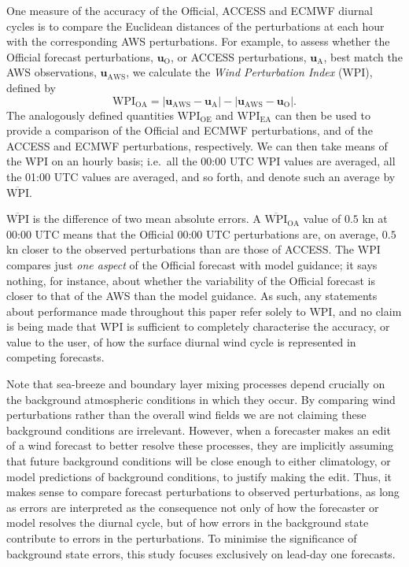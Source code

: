 \documentclass{ametsoc}
\begin{document}
One measure of the accuracy of the Official, ACCESS and ECMWF diurnal cycles is to compare the Euclidean distances of the perturbations at each hour with the corresponding AWS perturbations. For example, to assess whether the Official forecast perturbations, $\boldsymbol{u}_{\text{O}}$, or ACCESS perturbations, $\boldsymbol{u}_{\text{A}}$, best match the AWS observations, $\boldsymbol{u}_{\text{AWS}}$, we calculate the \textit{Wind Perturbation Index} (WPI), defined by 
\begin{equation}
\text{WPI}_\text{OA} = \left\lvert \boldsymbol{u}_{\text{AWS}}-\boldsymbol{u}_{\text{A}} \right\rvert - \left\lvert \boldsymbol{u}_{\text{AWS}}-\boldsymbol{u}_{\text{O}} \right\rvert. \label{Eq:WPI}
\end{equation} 
The analogously defined quantities $\text{WPI}_\text{OE}$ and $\text{WPI}_\text{EA}$ can then be used to provide a comparison of the Official and ECMWF perturbations, and of the ACCESS and ECMWF perturbations, respectively. We can then take means of the WPI on an hourly basis; i.e.~all the 00:00 UTC WPI values are averaged, all the 01:00 UTC values are averaged, and so forth, and denote such an average by $\overline{\text{WPI}}$. 

$\overline{\text{WPI}}$ is the difference of two mean absolute errors. A $\overline{\text{WPI}}_\text{OA}$ value of $0.5$ kn at 00:00 UTC means that the Official 00:00 UTC perturbations are, on average, $0.5$ kn closer to the observed perturbations than are those of ACCESS. The $\text{WPI}$ compares just \textit{one aspect} of the Official forecast with model guidance; it says nothing, for instance, about whether the variability of the Official forecast is closer to that of the AWS than the model guidance. As such, any statements about performance made throughout this paper refer solely to WPI, and no claim is being made that WPI is sufficient to completely characterise the accuracy, or value to the user, of how the surface diurnal wind cycle is represented in competing forecasts.

Note that sea-breeze and boundary layer mixing processes depend crucially on the background atmospheric conditions in which they occur. By comparing wind perturbations rather than the overall wind fields we are not claiming these background conditions are irrelevant. However, when a forecaster makes an edit of a wind forecast to better resolve these processes, they are implicitly assuming that future background conditions will be close enough to either climatology, or model predictions of background conditions, to justify making the edit. Thus, it makes sense to compare forecast perturbations to observed perturbations, as long as errors are interpreted as the consequence not only of how the forecaster or model resolves the diurnal cycle, but of how errors in the background state contribute to errors in the perturbations. To minimise the significance of background state errors, this study focuses exclusively on lead-day one forecasts.
\end{document}
